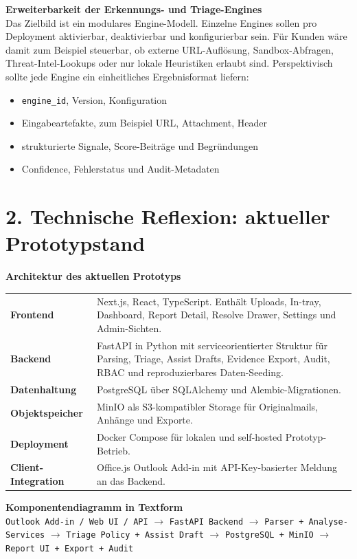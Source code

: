 \documentclass[10pt,a4paper]{article}
\begin{document}
\noindent\textbf{Erweiterbarkeit der Erkennungs- und Triage-Engines}\\
Das Zielbild ist ein modulares Engine-Modell. Einzelne Engines sollen pro Deployment aktivierbar, deaktivierbar und konfigurierbar sein. Für Kunden wäre damit zum Beispiel steuerbar, ob externe URL-Auflösung, Sandbox-Abfragen, Threat-Intel-Lookups oder nur lokale Heuristiken erlaubt sind. Perspektivisch sollte jede Engine ein einheitliches Ergebnisformat liefern:
\begin{itemize}
  \item \texttt{engine\_id}, Version, Konfiguration
  \item Eingabeartefakte, zum Beispiel URL, Attachment, Header
  \item strukturierte Signale, Score-Beiträge und Begründungen
  \item Confidence, Fehlerstatus und Audit-Metadaten
\end{itemize}

\newpage

\section*{2. Technische Reflexion: aktueller Prototypstand}

\noindent\textbf{Architektur des aktuellen Prototyps}\\
\noindent\begin{tabularx}{\textwidth}{@{}>{\bfseries}p{3.4cm}X@{}}
Frontend & Next.js, React, TypeScript. Enthält Uploads, In-tray, Dashboard, Report Detail, Resolve Drawer, Settings und Admin-Sichten.\\
Backend & FastAPI in Python mit serviceorientierter Struktur für Parsing, Triage, Assist Drafts, Evidence Export, Audit, RBAC und reproduzierbares Daten-Seeding.\\
Datenhaltung & PostgreSQL über SQLAlchemy und Alembic-Migrationen.\\
Objektspeicher & MinIO als S3-kompatibler Storage für Originalmails, Anhänge und Exporte.\\
Deployment & Docker Compose für lokalen und self-hosted Prototyp-Betrieb.\\
Client-Integration & Office.js Outlook Add-in mit API-Key-basierter Meldung an das Backend.\\
\end{tabularx}

\vspace{0.35em}
\noindent\textbf{Komponentendiagramm in Textform}\\
\texttt{Outlook Add-in / Web UI / API} \(\rightarrow\) \texttt{FastAPI Backend} \(\rightarrow\) \texttt{Parser + Analyse-Services} \(\rightarrow\) \texttt{Triage Policy + Assist Draft} \(\rightarrow\) \texttt{PostgreSQL + MinIO} \(\rightarrow\) \texttt{Report UI + Export + Audit}
\end{document}
